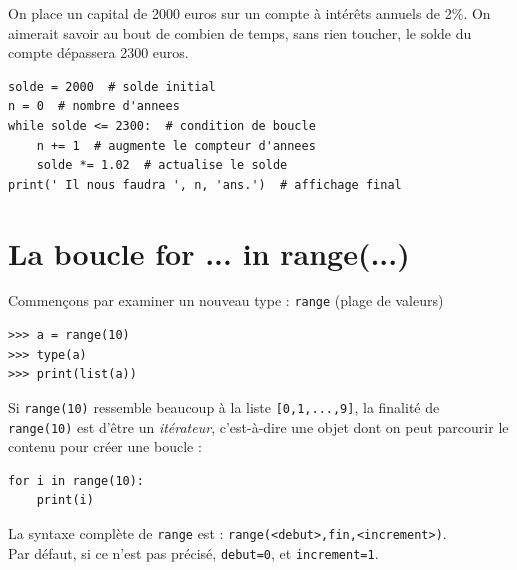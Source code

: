 On place un capital de 2000 euros sur un compte à intérêts annuels de 2\%. On aimerait savoir au bout de combien de temps, sans rien toucher, le 
solde du compte dépassera 2300 euros.\\

\begin{pyc}
\begin{verbatim}
solde = 2000  # solde initial
n = 0  # nombre d'annees
while solde <= 2300:  # condition de boucle
    n += 1  # augmente le compteur d'annees
    solde *= 1.02  # actualise le solde
print(' Il nous faudra ', n, 'ans.')  # affichage final   
\end{verbatim}
\end{pyc}

\section{La boucle for ... in range(...)}

Commençons par examiner un nouveau type : \texttt{range} (plage de valeurs)

\begin{pys}
\begin{verbatim}
>>> a = range(10)
>>> type(a)
>>> print(list(a))
\end{verbatim}
\end{pys}

Si \texttt{range(10)} ressemble beaucoup à la liste \texttt{[0,1,...,9]}, la finalité de \\\texttt{range(10)} est d'être un \textit{itérateur}, 
c'est-à-dire une objet dont on peut parcourir le contenu pour créer une boucle :

\begin{pyc}
\begin{verbatim}
for i in range(10):
    print(i)
\end{verbatim}
\end{pyc}
La syntaxe complète de \texttt{range} est : \texttt{range(<debut>,fin,<increment>)}.\\

Par défaut, si ce n'est pas précisé, \texttt{debut=0}, et \texttt{increment=1}.\\

